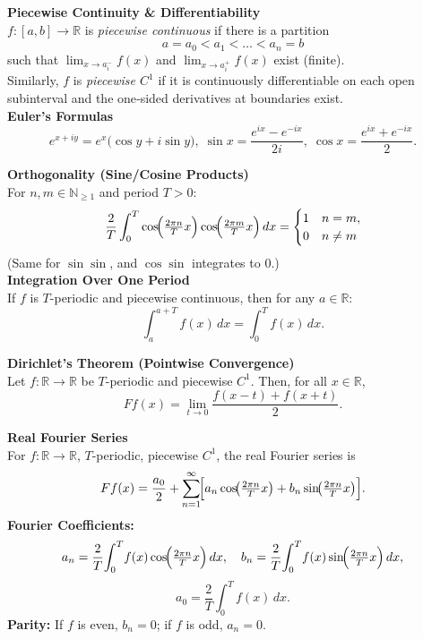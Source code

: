 \documentclass[8pt]{article}
\begin{document}
\begin{multicols}{2}

	\noindent \textbf{Piecewise Continuity \& Differentiability}\\
	$f:[a,b]\to\mathbb{R}$ is \emph{piecewise continuous} if there is a partition
	\[
		a=a_0 < a_1 < \dots < a_n = b
	\]
	such that $\lim_{x \to a_i^-} f(x)$ and $\lim_{x \to a_i^+} f(x)$ exist (finite).\\
	Similarly, $f$ is \emph{piecewise $C^1$} if it is continuously differentiable on each open subinterval and the one‐sided derivatives at boundaries exist.\\

	\noindent \textbf{Euler's Formulas}
	\[
		e^{x+iy} = e^{x}\bigl(\cos y + i \sin y\bigr),\;
		\sin x = \frac{e^{ix}-e^{-ix}}{2i},\;
		\cos x = \frac{e^{ix}+e^{-ix}}{2}.
	\]

	\noindent \textbf{Orthogonality (Sine/Cosine Products)}\\
	For $n,m \in \mathbb{N}_{\ge 1}$ and period $T>0$:
	\[
		\frac{2}{T} \int_{0}^{T}
		\cos\!\Bigl(\tfrac{2\pi n}{T}x\Bigr)\cos\!\Bigl(\tfrac{2\pi m}{T}x\Bigr)\,dx
		=
		\begin{cases}
			1 & n=m,    \\
			0 & n\neq m
		\end{cases}
	\]
	(Same for $\sin\sin$, and $\cos\sin$ integrates to $0$.)\\

	\noindent \textbf{Integration Over One Period}\\
	If $f$ is $T$-periodic and piecewise continuous, then for any $a\in\mathbb{R}$:
	\[
		\int_{a}^{a+T} f(x)\,dx = \int_{0}^{T} f(x)\,dx.
	\]

	\noindent \textbf{Dirichlet's Theorem (Pointwise Convergence)}\\
	Let \( f : \mathbb{R} \to \mathbb{R} \) be \( T \)-periodic and piecewise \( C^1 \). Then, for all \( x \in \mathbb{R} \),
	\[
		Ff(x) = \lim_{t \to 0} \frac{f(x - t) + f(x + t)}{2}.
	\]

	\noindent \textbf{Real Fourier Series}\\
	For $f:\mathbb{R}\to\mathbb{R}$, $T$-periodic, piecewise $C^1$, the real Fourier series is \vspace{-3px}
	\[ \vspace{-8px}
		Ff(x)= \frac{a_{0}}{2}
		+ \sum_{n=1}^{\infty}\!\Bigl[a_{n}\cos\!\bigl(\tfrac{2\pi n}{T}x\bigr)
			+ b_{n}\sin\!\bigl(\tfrac{2\pi n}{T}x\bigr)\Bigr].
	\]
	\noindent \textbf{Fourier Coefficients:} \vspace{-3px}
	\[
		a_{n} = \frac{2}{T}\!\int_{0}^{T}\!f(x)
		\cos\!\Bigl(\tfrac{2\pi n}{T}x\Bigr)\,dx,\quad
		b_{n} = \frac{2}{T}\!\int_{0}^{T}\!f(x)
		\sin\!\Bigl(\tfrac{2\pi n}{T}x\Bigr)\,dx,
	\] \vspace{-8px}
	\[
		a_{0} = \frac{2}{T}\int_{0}^{T} f(x)\,dx.
	\]
	\noindent \textbf{Parity:} If $f$ is even, $b_{n}=0$; if $f$ is odd, $a_{n}=0$.\\


\end{multicols}
\end{document}
